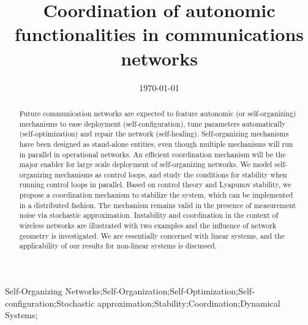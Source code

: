 \documentclass[10pt,conference,letterpaper]{IEEEtran}
\begin{document}
 

\title{Coordination of autonomic functionalities in communications networks}

\author{


}

\date{\today}
\maketitle

\begin{abstract}
	Future communication networks are expected to feature autonomic (or self-organizing) mechanisms to ease deployment (self-configuration), tune parameters automatically (self-optimization) and repair the network (self-healing). Self-organizing mechanisms have been designed as stand-alone entities, even though multiple mechanisms will run in parallel in operational networks. An efficient coordination mechanism will be the major enabler for large scale deployment of self-organizing networks. We model self-organizing mechanisms as control loops, and study the conditions for stability when running control loops in parallel. Based on control theory and Lyapunov stability, we propose a coordination mechanism to stabilize the system, which can be implemented in a distributed fashion. The mechanism remains valid in the presence of measurement noise via stochastic approximation. Instability and coordination in the context of wireless networks are illustrated with two examples and the influence of network geometry is investigated. We are essentially concerned with linear systems, and the applicability of our results for non-linear systems is discussed.
\end{abstract}
\begin{IEEEkeywords}
Self-Organizing Networks;Self-Organization;Self-Optimization;Self-configuration;Stochastic approximation;Stability;Coordination;Dynamical Systems;      
\end{IEEEkeywords}
\end{document}
